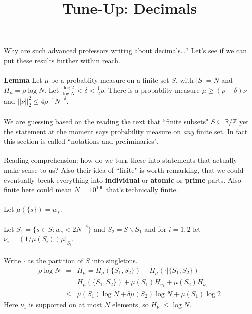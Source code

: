 \documentclass[12pt]{article}
\title{Tune-Up: Decimals}
\date{}
\begin{document}
\sffamily

\maketitle

{\fontsize{16pt}{16pt}\selectfont 

\noindent 

\noindent Why are such advanced professors writing about decimals\dots?  Let's see if we can put these results further within reach. \\ \\
\textbf{Lemma} Let $\mu$ be a probablity measure on a finite set $S$, with $|S| = N$ and $H_\mu = \rho \log N$.  Let $\frac{\log 2}{\log N} < \delta <  \frac{1}{2}\rho$. There is a probablity measure $\mu \geq (\rho - \delta) \nu $ and $||\nu||_2^2 \leq 4 \rho^{-1} N^{-\delta} $. \\ \\
We are guessing based on the reading the text that ``finite subsets" $S \subseteq \mathbb{R}/\mathbb{Z}$ yet the statement at the moment says probability measure on \textit{any} finite set.  In fact this section is called 	``notations and preliminaries". \\ \\
Reading comprehension: how do we turn these into statements that actually make sense to us? Also their idea of ``finite" is worth remarking, that we could eventually break everything into \textbf{individual}  or \textbf{atomic} or \textbf{prime} parts.  Also finite here could mean $N = 10^{100}$ that's technically finite. \\ \\
Let $\mu(\{ s\}) = w_s$. \\ \\
Let $S_1 = \{ s \in S : w_s < 2 N^{-\delta} \}$ and $S_2 = S \backslash S_1$ and for $i = 1, 2$ let $\nu_i = (1/\mu(S_i)) \mu|_{S_i}$. \\ \\
Write $\cdot$ as the partition of $S$ into singletons. 
\begin{eqnarray*}
\rho \log N &=& H_\mu = H_\mu ( \{ S_1, S_2\} ) + H_\mu( \cdot | \{ S_1, S_2\} ) \\ 
&=& H_\mu( \{ S_1, S_2 \}) + \mu(S_1) H_{v_1} + \mu(S_2) H_{\nu_2} \\ 
&\leq & \mu(S_1) \log N + \delta \mu(S_2) \log N + \mu(S_1) \log 2  
\end{eqnarray*}
Here $ \nu_1$ is supported on at most $N$ elements, so $H_{\nu_1}\leq \log N $. \\
}
\end{document}
